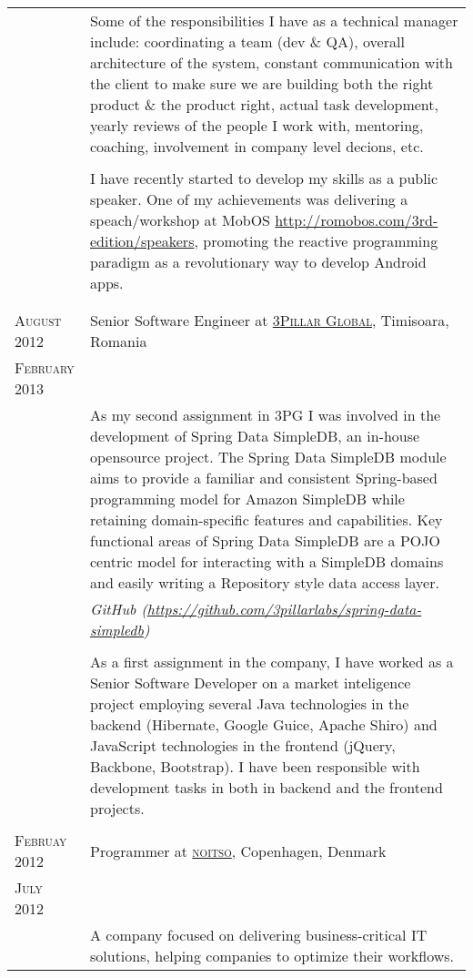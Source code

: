 \documentclass[a4paper,10pt]{article}
\begin{document}
\begin{longtable}{p{2.5cm}|p{11cm}}
& \footnotesize{Some of the responsibilities I have as a technical manager include: coordinating a team (dev \& QA), overall architecture of the system, constant communication with the client to make sure we are building both the right product \& the product right, actual task development, yearly reviews of the people I work with, mentoring, coaching, involvement in company level decions, etc.}\\ \\
& \footnotesize{I have recently started to develop my skills as a public speaker. One of my achievements was delivering a speach/workshop at MobOS \url{http://romobos.com/3rd-edition/speakers}, promoting the reactive programming paradigm as a revolutionary way to develop Android apps.}\\ \\
\multicolumn{2}{c}{} \\ 

 \raggedleft \textsc{August 2012} & Senior Software Engineer at
 \textsc{\href{http://www.3pillarglobal.com/}{3Pillar Global}}, Timisoara, Romania
 \\\raggedleft \textsc{February 2013}\\
& \footnotesize{As my second assignment in 3PG I was involved in the development of Spring Data SimpleDB, an in-house opensource project. The Spring Data SimpleDB module aims to provide a familiar and consistent Spring-based programming model for Amazon SimpleDB while retaining domain-specific features and capabilities. Key functional areas of Spring Data SimpleDB are a POJO centric model for interacting with a SimpleDB domains and easily writing a Repository style data access layer.}\\
& \footnotesize{\emph{GitHub (\url{https://github.com/3pillarlabs/spring-data-simpledb})}} \\ \\
& \footnotesize{As a first assignment in the company, I have worked as a Senior Software Developer on a market inteligence project employing several Java technologies in the backend (Hibernate, Google Guice, Apache Shiro) and JavaScript technologies in the
frontend (jQuery, Backbone, Bootstrap). I have been responsible with development tasks in both in backend and the frontend projects.}\\
\multicolumn{2}{c}{} \\ 

 \raggedleft \textsc{Februay 2012} & Programmer at
 \textsc{\href{http://www.noitso.dk/}{noitso}}, Copenhagen, Denmark
 \\\raggedleft \textsc{July 2012}\\& 
 \footnotesize{A company focused on delivering business-critical IT solutions, helping companies to optimize their workflows.}\\


\end{longtable}
\end{document}
